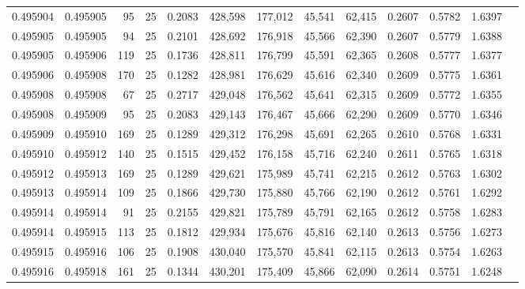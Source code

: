 \begin{tabular}{rrrrrrrrrrrrr}
0.495904 & 0.495905 &    95 &  25 &                                     0.2083 & 428,598 & 177,012 &  45,541 &  62,415 & 0.2607 & 0.5782 & 1.6397 \\
0.495905 & 0.495905 &    94 &  25 &                                     0.2101 & 428,692 & 176,918 &  45,566 &  62,390 & 0.2607 & 0.5779 & 1.6388 \\
0.495905 & 0.495906 &   119 &  25 &                                     0.1736 & 428,811 & 176,799 &  45,591 &  62,365 & 0.2608 & 0.5777 & 1.6377 \\
0.495906 & 0.495908 &   170 &  25 &                                     0.1282 & 428,981 & 176,629 &  45,616 &  62,340 & 0.2609 & 0.5775 & 1.6361 \\
0.495908 & 0.495908 &    67 &  25 &                                     0.2717 & 429,048 & 176,562 &  45,641 &  62,315 & 0.2609 & 0.5772 & 1.6355 \\
0.495908 & 0.495909 &    95 &  25 &                                     0.2083 & 429,143 & 176,467 &  45,666 &  62,290 & 0.2609 & 0.5770 & 1.6346 \\
0.495909 & 0.495910 &   169 &  25 &                                     0.1289 & 429,312 & 176,298 &  45,691 &  62,265 & 0.2610 & 0.5768 & 1.6331 \\
0.495910 & 0.495912 &   140 &  25 &                                     0.1515 & 429,452 & 176,158 &  45,716 &  62,240 & 0.2611 & 0.5765 & 1.6318 \\
0.495912 & 0.495913 &   169 &  25 &                                     0.1289 & 429,621 & 175,989 &  45,741 &  62,215 & 0.2612 & 0.5763 & 1.6302 \\
0.495913 & 0.495914 &   109 &  25 &                                     0.1866 & 429,730 & 175,880 &  45,766 &  62,190 & 0.2612 & 0.5761 & 1.6292 \\
0.495914 & 0.495914 &    91 &  25 &                                     0.2155 & 429,821 & 175,789 &  45,791 &  62,165 & 0.2612 & 0.5758 & 1.6283 \\
0.495914 & 0.495915 &   113 &  25 &                                     0.1812 & 429,934 & 175,676 &  45,816 &  62,140 & 0.2613 & 0.5756 & 1.6273 \\
0.495915 & 0.495916 &   106 &  25 &                                     0.1908 & 430,040 & 175,570 &  45,841 &  62,115 & 0.2613 & 0.5754 & 1.6263 \\
0.495916 & 0.495918 &   161 &  25 &                                     0.1344 & 430,201 & 175,409 &  45,866 &  62,090 & 0.2614 & 0.5751 & 1.6248 \\

\end{tabular}
